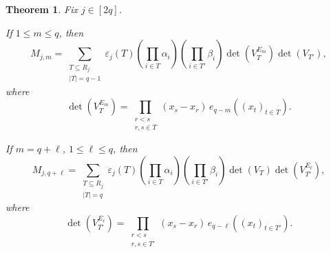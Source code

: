 \documentclass[11pt,a4paper]{article}
\newtheorem{theorem}{Theorem}[section]
\theoremstyle{definition}
\begin{document}
\begin{theorem}\label{thm:inv-explicit}
Fix \(j\in[2q]\).

If \(1\leq m\leq q\), then
\begin{equation}\label{eq:Mjm-alpha}
M_{j,m}
=
\sum_{\substack{T\subseteq R_j\\ |T|=q-1}}
\varepsilon_j(T)
\left(\prod_{i\in T}\alpha_i\right)
\left(\prod_{i\in T'}\beta_i\right)
\det\!\left(V_T^{E_m}\right)
\det(V_{T'}),
\end{equation}
where
\begin{equation}\label{eq:generalized-vandermonde-alpha}
\det\!\left(V_T^{E_m}\right)
=
\prod_{\substack{r<s\\ r,s\in T}}(x_s-x_r)\,
e_{q-m}\!\left((x_t)_{t\in T}\right).
\end{equation}

If \(m=q+\ell\), \(1\leq\ell\leq q\), then
\begin{equation}\label{eq:Mjm-beta}
M_{j,q+\ell}
=
\sum_{\substack{T\subseteq R_j\\ |T|=q}}
\varepsilon_j(T)
\left(\prod_{i\in T}\alpha_i\right)
\left(\prod_{i\in T'}\beta_i\right)
\det(V_T)
\det\!\left(V_{T'}^{E_\ell}\right),
\end{equation}
where
\begin{equation}\label{eq:generalized-vandermonde-beta}
\det\!\left(V_{T'}^{E_\ell}\right)
=
\prod_{\substack{r<s\\ r,s\in T'}}(x_s-x_r)\,
e_{q-\ell}\!\left((x_t)_{t\in T'}\right).
\end{equation}
\end{theorem}
\end{document}

